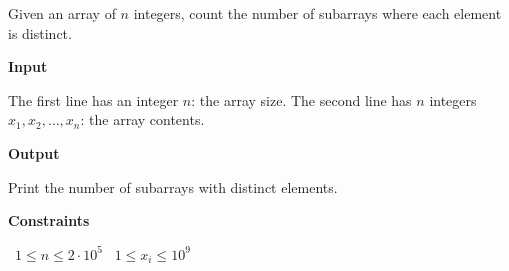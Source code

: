 Given an array of $n$ integers, count the number of subarrays where each element is distinct.

\vspace{0.3cm}\noindent\textbf{Input}

The first line has an integer $n$: the array size.
The second line has $n$ integers $x_1,x_2,\dots,x_n$: the array contents.

\vspace{0.3cm}\noindent\textbf{Output}

Print the number of subarrays with distinct elements.

\vspace{0.3cm}\noindent\textbf{Constraints}

\textbullet\ $1 \le n \le 2 \cdot 10^5$
\textbullet\ $1 \le x_i \le 10^9$